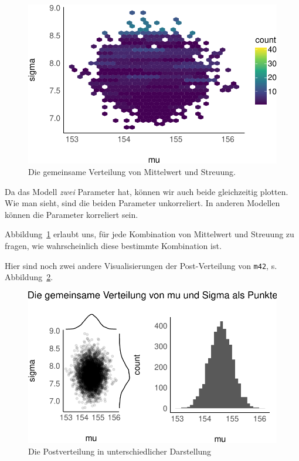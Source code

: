 \documentclass[
  a4paper,
  DIV=11]{scrreprt}
\theoremstyle{definition}
\theoremstyle{remark}
\begin{document}
\begin{figure}[H]

{\centering \includegraphics{./gauss_files/figure-pdf/fig-m42-post-joint-1.pdf}

}

\caption{\label{fig-m42-post-joint}Die gemeinsame Verteilung von
Mittelwert und Streuung.}

\end{figure}

Da das Modell \emph{zwei} Parameter hat, können wir auch beide
gleichzeitig plotten. Wie man sieht, sind die beiden Parameter
unkorreliert. In anderen Modellen können die Parameter korreliert sein.

Abbildung~\ref{fig-m42-post-joint} erlaubt uns, für jede Kombination von
Mittelwert und Streuung zu fragen, wie wahrscheinlich diese bestimmte
Kombination ist.

Hier sind noch zwei andere Visualisierungen der Post-Verteilung von
\texttt{m42}, s. Abbildung~\ref{fig-m42-post-anders}.

\begin{figure}

{\centering \includegraphics{./gauss_files/figure-pdf/fig-m42-post-anders-1.pdf}

}

\caption{\label{fig-m42-post-anders}Die Postverteilung in
unterschiedlicher Darstellung}

\end{figure}
\end{document}
